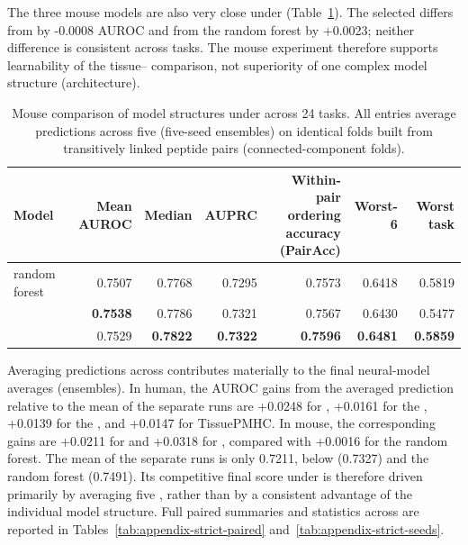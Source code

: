 The three mouse models are also very close under \plainPeptideOOF{} (Table~\ref{tab:mouse-strict-architectures}). The selected \plainMMoE{} differs from \plainSharedHeads{} by -0.0008 AUROC and from the \plainBLOSUM{} random forest by +0.0023; neither difference is consistent across tasks. The mouse experiment therefore supports learnability of the tissue--\plainHtwo{} comparison, not superiority of one complex model structure (architecture).

\begin{table}[tbp]
\centering
\caption{Mouse comparison of model structures under \plainPeptideOOF{} across 24 tasks. All entries average predictions across five \plainSeeds{} (five-seed ensembles) on identical folds built from transitively linked peptide pairs (connected-component folds).}
\label{tab:mouse-strict-architectures}
\scriptsize
\setlength{\tabcolsep}{1pt}
\begin{tabularx}{\textwidth}{>{\raggedright\arraybackslash}Xrrrrrr}
\toprule
Model & Mean AUROC & Median & AUPRC & \shortstack{Within-pair ordering\\accuracy (PairAcc)} & Worst-6 & Worst task \\
\midrule
\plainBLOSUM{} random forest & 0.7507 & 0.7768 & 0.7295 & 0.7573 & 0.6418 & 0.5819 \\
\plainSharedHeads{} & \textbf{0.7538} & 0.7786 & 0.7321 & 0.7567 & 0.6430 & 0.5477 \\
\plainMMoE{} & 0.7529 & \textbf{0.7822} & \textbf{0.7322} & \textbf{0.7596} & \textbf{0.6481} & \textbf{0.5859} \\
\bottomrule
\end{tabularx}
\end{table}

Averaging predictions across \plainSeeds{} contributes materially to the final neural-model averages (ensembles). In human, the AUROC gains from the averaged prediction relative to the mean of the separate runs are +0.0248 for \plainSharedHeads{}, +0.0161 for the \plainPlainDual{}, +0.0139 for the \plainAuxDual{}, and +0.0147 for TissuePMHC. In mouse, the corresponding gains are +0.0211 for \plainSharedHeads{} and +0.0318 for \plainMMoE{}, compared with +0.0016 for the random forest. The mean of the separate \plainMMoE{} runs is only 0.7211, below \plainSharedHeads{} (0.7327) and the random forest (0.7491). Its competitive final score under \plainPeptideOOF{} is therefore driven primarily by averaging five \plainSeeds{}, rather than by a consistent advantage of the individual model structure. Full paired summaries and statistics across \plainSeeds{} are reported in Tables~\ref{tab:appendix-strict-paired} and~\ref{tab:appendix-strict-seeds}.
